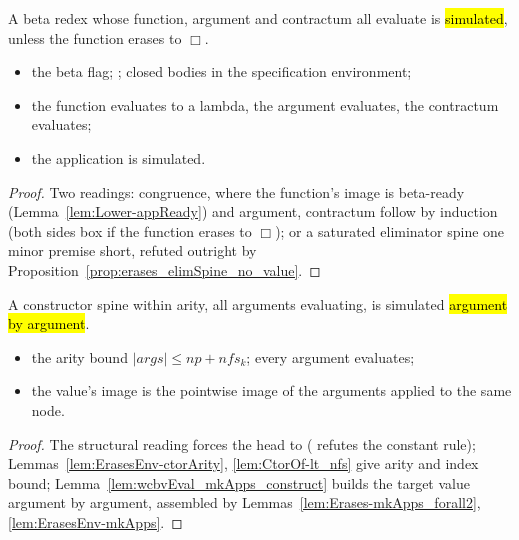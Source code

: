 \begin{proposition}
\label{prop:beta_arm}
\leanok
{}
 A beta redex whose function, argument and contractum all evaluate is \hl{simulated},
unless the function erases to $\Box$.
\begin{itemize}
\item {} the beta flag; ; closed bodies in the specification
environment;
\item the function evaluates to a lambda, the argument evaluates, the contractum evaluates;
\item {} the application is simulated.
\end{itemize}
\end{proposition}
\begin{proof}
\leanok
{}
 Two \Lower{} readings: congruence, where the function's image is beta-ready
(Lemma~\ref{lem:Lower-appReady}) and argument, contractum follow by induction (both sides box if the
function erases to $\Box$); or a saturated eliminator spine one minor premise short, refuted outright by
Proposition~\ref{prop:erases_elimSpine_no_value}.
\end{proof}

\begin{proposition}
\label{prop:ctorVal_arm}
\leanok
{}
 A constructor spine within arity, all arguments evaluating, is simulated \hl{argument by
argument}.
\begin{itemize}
\item {} the arity bound $|args| \le np + nfs_k$; every argument evaluates;
\item {} the value's image is the pointwise image of the arguments applied to the same
 node.
\end{itemize}
\end{proposition}
\begin{proof}
\leanok
{}
 The structural reading forces the head to  ( refutes the
constant rule); Lemmas~\ref{lem:ErasesEnv-ctorArity}, \ref{lem:CtorOf-lt_nfs} give arity and index bound;
Lemma~\ref{lem:wcbvEval_mkApps_construct} builds the target value argument by argument, assembled by
Lemmas~\ref{lem:Erases-mkApps_forall2}, \ref{lem:ErasesEnv-mkApps}.
\end{proof}

